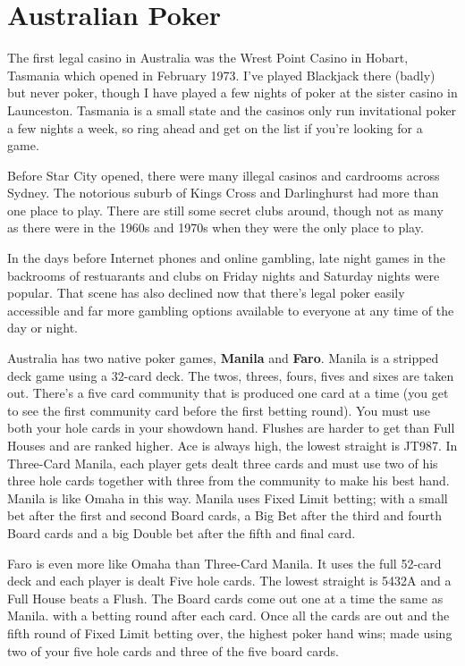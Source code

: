 \section{Australian Poker}

The first legal casino in Australia was the Wrest Point Casino in
Hobart, Tasmania which opened in February 1973. I've played Blackjack
there (badly) but never poker, though I have played a few nights of
poker at the sister casino in Launceston. Tasmania is a small state
and the casinos only run invitational poker a few nights a week, so
ring ahead and get on the list if you're looking for a game.

Before Star City opened, there were many illegal casinos and
cardrooms across Sydney. The notorious suburb of Kings Cross and
Darlinghurst had more than one place to play. There are still some
secret clubs around, though not as many as there were in
the 1960s and 1970s when they were the only place to play.

In the days before Internet phones and online gambling, late night
games in the backrooms of restuarants and clubs on Friday nights and
Saturday nights were popular. That scene has also declined now that
there's legal poker easily accessible and far more gambling options
available to everyone at any time of the day or night.

Australia has two native poker games, \textbf{Manila} and
\textbf{Faro}. Manila is a stripped deck game using a 32-card
deck. The twos, threes, fours, fives and sixes are taken out.
There's a five card community that is produced one card at a time (you
get to see the first community card before the first betting round).
You must use both your hole cards in your showdown hand. Flushes are harder
to get than Full Houses and are ranked higher. Ace is always high, the
lowest straight is JT987. In Three-Card Manila,
each player gets dealt three cards and must use two of his three hole
cards together with three from the community to make his best
hand. Manila is like Omaha in this way. Manila uses Fixed Limit
betting; with a small bet after the first and second Board cards, a
Big Bet after the third and fourth Board cards and a big Double bet
after the fifth and final card.

Faro is even more like Omaha than Three-Card Manila. It uses the full
52-card deck and each player is dealt Five hole cards. The lowest
straight is 5432A and a Full House beats a Flush. The Board
cards come out one at a time the same as Manila. with a betting round
after each card. Once all the cards are out and the fifth round of
Fixed Limit betting over, the highest poker hand wins; made using two
of your five hole cards and three of the five board cards.

